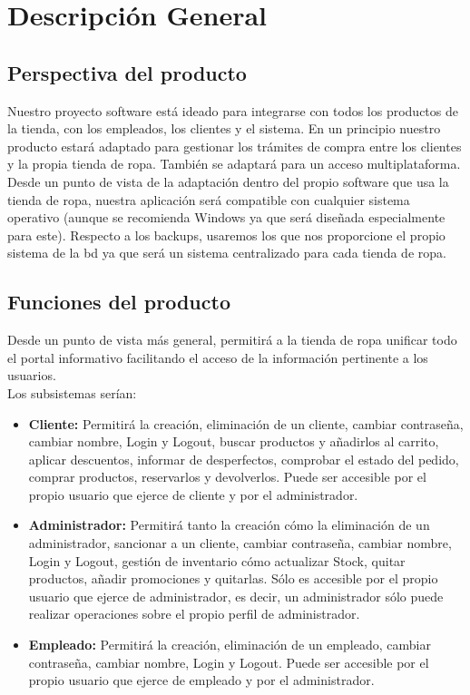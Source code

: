 \section{Descripción General }
\label{sec:desc_gen}
\subsection{Perspectiva del producto}
Nuestro proyecto software está ideado para integrarse con todos los productos de la tienda, con los empleados, los clientes y el sistema.
En un principio nuestro producto estará adaptado para gestionar los trámites de compra entre los clientes y la propia tienda de ropa. También se adaptará para un acceso multiplataforma.
Desde un punto de vista de la adaptación dentro del propio software que usa la tienda de ropa, nuestra aplicación será compatible con cualquier sistema operativo (aunque se recomienda Windows ya que será diseñada especialmente para este).
Respecto a los backups, usaremos los que nos proporcione el propio sistema de la \gls{bd} ya que será un sistema centralizado para cada tienda de ropa.
\subsection{Funciones del producto}
Desde un punto de vista más general, permitirá a la tienda de ropa unificar todo el portal
informativo facilitando el acceso de la información pertinente a los usuarios.\\
Los subsistemas serían:

\begin{itemize}
    \item\textbf{Cliente: }Permitirá la creación, eliminación de un cliente, cambiar contraseña, cambiar nombre, Login y Logout, buscar productos y añadirlos al carrito, aplicar descuentos, informar de desperfectos, comprobar el estado del pedido, comprar productos, reservarlos y devolverlos. Puede ser accesible por el propio usuario que ejerce de cliente y por el administrador.
    \item\textbf{Administrador: }Permitirá tanto la creación cómo la eliminación de un administrador, sancionar a un cliente, cambiar contraseña, cambiar nombre, Login y Logout, gestión de inventario cómo actualizar Stock, quitar productos, añadir promociones y quitarlas. Sólo es accesible por el propio usuario que ejerce de administrador, es decir, un administrador sólo puede realizar operaciones sobre el propio perfil de administrador.
    \item\textbf{Empleado: }Permitirá la creación, eliminación de un empleado, cambiar contraseña, cambiar nombre, Login y Logout. Puede ser accesible por el propio usuario que ejerce de empleado y por el administrador.
\end{itemize}

